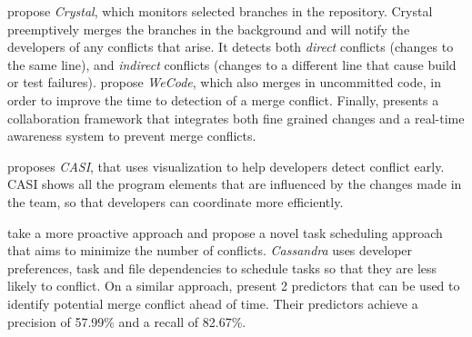 \citet{Brun2011} propose \emph{Crystal}, which monitors selected branches in the repository. 
Crystal preemptively merges the branches in the background and will notify the developers of any conflicts that arise. 
It detects both \emph{direct} conflicts (changes to the same line), and \emph{indirect} conflicts (changes to a different line that cause build or test failures).
\citet{Guimaraes} propose \emph{WeCode}, which also merges in uncommitted code, in order to improve the time to detection of a merge conflict.
Finally, \citet{estler2014awareness} presents a collaboration framework that integrates both fine grained changes and a real-time awareness system to prevent merge conflicts.

\citet{servant_casi:_2010} proposes \emph{CASI}, that uses visualization to help developers detect conflict early.
CASI shows all the program elements that are influenced by the changes made in the team, so that developers can coordinate more efficiently.

\citet{kasi_cassandra:_2013} take a more proactive approach and propose a novel task scheduling approach that aims to minimize the number of conflicts. 
\emph{Cassandra} uses developer preferences, task and file dependencies to schedule tasks so that they are less likely to conflict.
On a similar approach, \citet{accioly_analyzing_2018} present 2 predictors that can be used to identify potential merge conflict ahead of time.
Their predictors achieve a precision of 57.99\% and a recall of 82.67\%.
